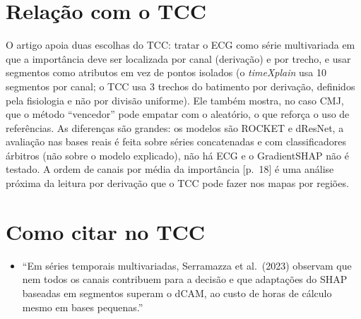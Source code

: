 \documentclass[11pt,a4paper]{article}
\begin{document}
\section{Relação com o TCC}
O artigo apoia duas escolhas do TCC: tratar o ECG como série multivariada em que a importância deve ser localizada por canal (derivação) e por trecho, e usar segmentos como atributos em vez de pontos isolados (o \textit{timeXplain} usa 10 segmentos por canal; o TCC usa 3 trechos do batimento por derivação, definidos pela fisiologia e não por divisão uniforme). Ele também mostra, no caso CMJ, que o método ``vencedor'' pode empatar com o aleatório, o que reforça o uso de referências. As diferenças são grandes: os modelos são ROCKET e dResNet, a avaliação nas bases reais é feita sobre séries concatenadas e com classificadores árbitros (não sobre o modelo explicado), não há ECG e o GradientSHAP não é testado. A ordem de canais por média da importância [p.~18] é uma análise próxima da leitura por derivação que o TCC pode fazer nos mapas por regiões.

\section{Como citar no TCC}
\begin{itemize}
\item ``Em séries temporais multivariadas, Serramazza et al.\ (2023) observam que nem todos os canais contribuem para a decisão e que adaptações do SHAP baseadas em segmentos superam o dCAM, ao custo de horas de cálculo mesmo em bases pequenas.''
\end{itemize}
\end{document}
